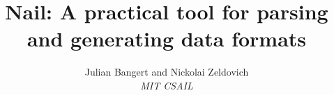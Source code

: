 \documentclass[10pt,twocolumn]{article}
\begin{document}
\author{Julian Bangert and Nickolai Zeldovich \\ \em MIT CSAIL}
\date{}
\title{Nail: A practical tool for parsing and generating data formats}

\maketitle


% 
% 

%

%



\setlength{\bibsep}{2.5pt}


\end{document}
